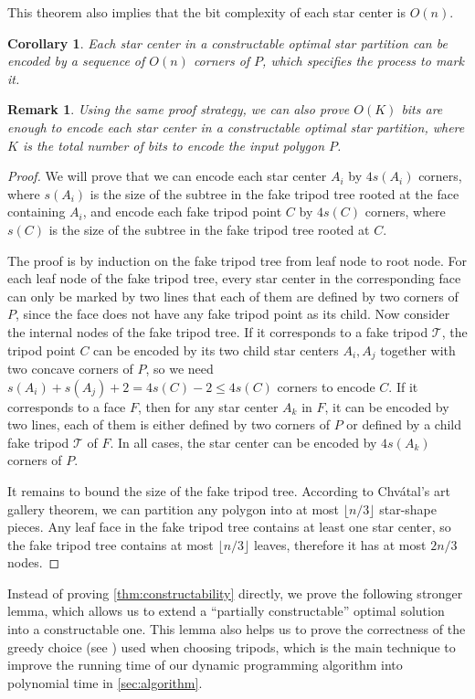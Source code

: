 \documentclass[10pt,a4paper]{article}
\newtheorem{corollary}{Corollary}[section]
\newtheorem{remark}{Remark}[section]
\begin{document}
This theorem also implies that the bit complexity of each star center is $O(n)$. 
\begin{corollary}
    \label{cor:bit-complexity}
    Each star center in a constructable optimal star partition can be encoded by a sequence of $O(n)$ corners of $P$, which specifies the process to mark it. 
\end{corollary}
\begin{remark}
    Using the same proof strategy, we can also prove $O(K)$ bits are enough to encode each star center in a constructable optimal star partition, where $K$ is the total number of bits to encode the input polygon $P$. 
\end{remark}
\begin{proof}
    We will prove that we can encode each star center $A_i$ by $4s(A_i)$ corners, where $s(A_i)$ is the size of the subtree in the fake tripod tree rooted at the face containing $A_i$, and encode each fake tripod point $C$ by $4s(C)$ corners, where $s(C)$ is the size of the subtree in the fake tripod tree rooted at $C$. 

    The proof is by induction on the fake tripod tree from leaf node to root node. 
    For each leaf node of the fake tripod tree, every star center in the corresponding face can only be marked by two lines that each of them are defined by two corners of $P$, since the face does not have any fake tripod point as its child. 
    Now consider the internal nodes of the fake tripod tree. 
    If it corresponds to a fake tripod $\mathcal{T}$, the tripod point $C$ can be encoded by its two child star centers $A_i, A_j$ together with two concave corners of $P$, so we need $s(A_i) + s(A_j) + 2 = 4s(C) - 2 \leq 4s(C)$ corners to encode $C$. 
    If it corresponds to a face $F$, then for any star center $A_k$ in $F$, it can be encoded by two lines, each of them is either defined by two corners of $P$ or defined by a child fake tripod $\mathcal{T}$ of $F$. 
    In all cases, the star center can be encoded by $4s(A_k)$ corners of $P$. 

    It remains to bound the size of the fake tripod tree. 
    According to Chvátal's art gallery theorem, we can partition any polygon into at most $\lfloor n/3\rfloor$ star-shape pieces. 
    Any leaf face in the fake tripod tree contains at least one star center, so the fake tripod tree contains at most $\lfloor n/3\rfloor$ leaves, therefore it has at most $2n/3$ nodes. 
\end{proof}

Instead of proving \cref{thm:constructability} directly, we prove the following stronger lemma, which allows us to extend a ``partially constructable'' optimal solution into a constructable one. This lemma also helps us to prove the correctness of the greedy choice (see ) used when choosing tripods, which is the main technique to improve the running time of our dynamic programming algorithm into polynomial time in \cref{sec:algorithm}. 
\end{document}

